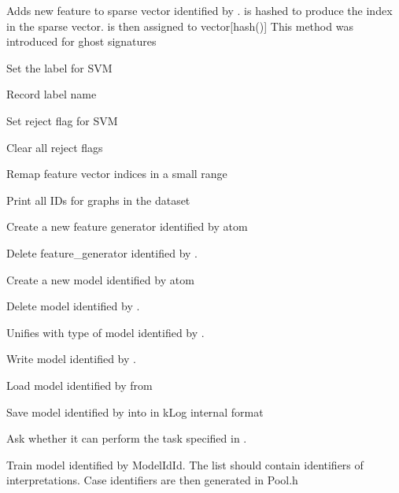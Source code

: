 \begin{description}
Adds new feature to sparse vector identified by . 
is hashed to produce the index in the sparse vector.  is
then assigned to vector[hash()]
This method was introduced for ghost signatures

Set the label for SVM 

Record label name

Set reject flag for SVM 

Clear all reject flags

Remap feature vector indices in a small range

Print all IDs for graphs in the dataset

Create a new feature generator identified by atom 

Delete feature_generator identified by .

Create a new model identified by atom 

Delete model identified by .

Unifies  with type of model identified by .

Write model identified by .

Load model identified by  from 

Save model identified by  into  in kLog internal format

Ask  whether it can perform the task specified in .

Train model identified by ModelIdId. The list  should
contain identifiers of interpretations. Case identifiers are then
generated in Pool.h


\end{description}
